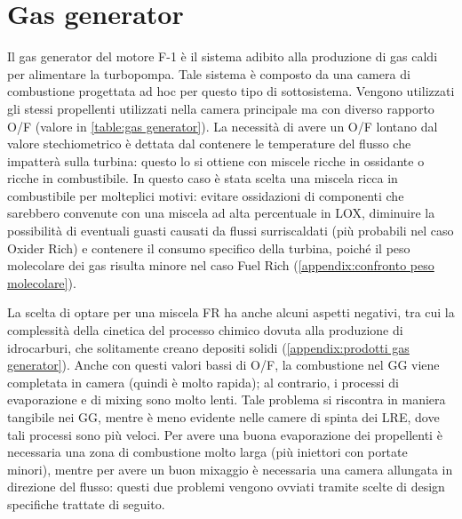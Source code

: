\section{Gas generator}
\label{sec:gas generator}

Il gas generator del motore F-1 è il sistema adibito alla produzione di gas caldi per alimentare la turbopompa. Tale sistema è composto da una camera di combustione progettata ad hoc per questo tipo di sottosistema.
Vengono utilizzati gli stessi propellenti utilizzati nella camera principale ma con diverso rapporto O/F (valore in \autoref{table:gas generator}). La necessità di avere un O/F lontano dal valore stechiometrico è dettata dal contenere le temperature del flusso che impatterà sulla turbina: questo lo si ottiene con miscele ricche in ossidante o ricche in combustibile.
In questo caso è stata scelta una miscela ricca in combustibile per molteplici motivi: evitare ossidazioni di componenti che sarebbero convenute con una miscela ad alta percentuale in LOX, diminuire la possibilità di eventuali guasti causati da flussi surriscaldati (più probabili nel caso Oxider Rich) e contenere il consumo specifico della turbina, poiché il peso molecolare dei gas risulta minore nel caso Fuel Rich (\autoref{appendix:confronto peso molecolare}).

La scelta di optare per una miscela FR ha anche alcuni aspetti negativi, tra cui la complessità della cinetica del processo chimico dovuta alla produzione di idrocarburi, che solitamente creano depositi solidi (\autoref{appendix:prodotti gas generator}).
Anche con questi valori bassi di O/F, la combustione nel GG viene completata in camera (quindi è molto rapida); al contrario, i processi di evaporazione e di mixing sono molto lenti. Tale problema si riscontra in maniera tangibile nei GG, mentre è meno evidente nelle camere di spinta dei LRE, dove tali processi sono più veloci.
Per avere una buona evaporazione dei propellenti è necessaria una zona di combustione molto larga (più iniettori con portate minori), mentre per avere un buon mixaggio è necessaria una camera allungata in direzione del flusso: questi due problemi vengono ovviati tramite scelte di design specifiche trattate di seguito.

